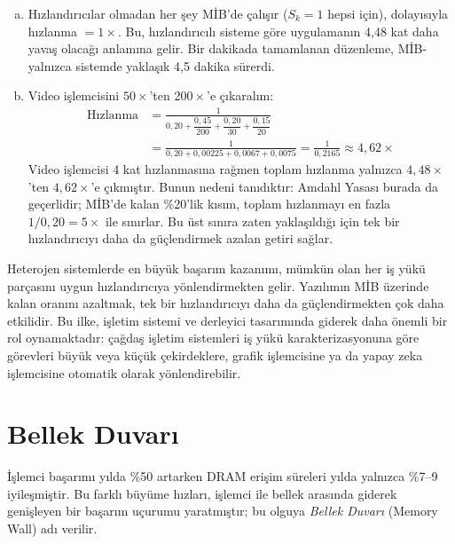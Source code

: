 \begin{ornek}[2.12]
\begin{enumerate}[(a)]
    \item Hızlandırıcılar olmadan her şey MİB'de çalışır ($S_k = 1$ hepsi için), dolayısıyla hızlanma $= 1\times$. Bu, hızlandırıcılı sisteme göre uygulamanın 4,48 kat daha yavaş olacağı anlamına gelir. Bir dakikada tamamlanan düzenleme, MİB-yalnızca sistemde yaklaşık 4,5 dakika sürerdi.

    \item Video işlemcisini $50\times$'ten $200\times$'e çıkaralım:
    \begin{align*}
    \text{Hızlanma} &= \frac{1}{0{,}20 + \dfrac{0{,}45}{200} + \dfrac{0{,}20}{30} + \dfrac{0{,}15}{20}} \\[6pt]
    &= \frac{1}{0{,}20 + 0{,}00225 + 0{,}0067 + 0{,}0075}
    = \frac{1}{0{,}2165}
    \approx 4{,}62\times
    \end{align*}
    Video işlemcisi 4 kat hızlanmasına rağmen toplam hızlanma yalnızca $4{,}48\times$'ten $4{,}62\times$'e çıkmıştır. Bunun nedeni tanıdıktır: Amdahl Yasası burada da geçerlidir; MİB'de kalan \%20'lik kısım, toplam hızlanmayı en fazla $1/0{,}20 = 5\times$ ile sınırlar. Bu üst sınıra zaten yaklaşıldığı için tek bir hızlandırıcıyı daha da güçlendirmek azalan getiri sağlar.
\end{enumerate}
\end{ornek}

\begin{bilginot}
Heterojen sistemlerde en büyük başarım kazanımı, mümkün olan her iş yükü parçasını uygun hızlandırıcıya yönlendirmekten gelir. Yazılımın MİB üzerinde kalan oranını azaltmak, tek bir hızlandırıcıyı daha da güçlendirmekten çok daha etkilidir. Bu ilke, işletim sistemi ve derleyici tasarımında giderek daha önemli bir rol oynamaktadır: çağdaş işletim sistemleri iş yükü karakterizasyonuna göre görevleri büyük veya küçük çekirdeklere, grafik işlemcisine ya da yapay zeka işlemcisine otomatik olarak yönlendirebilir.
\end{bilginot}


\section{Bellek Duvarı}
\label{sec:bellek-duvari}

İşlemci başarımı yılda \%50 artarken DRAM erişim süreleri yılda yalnızca \%7--9 iyileşmiştir. Bu farklı büyüme hızları, işlemci ile bellek arasında giderek genişleyen bir başarım uçurumu yaratmıştır; bu olguya \emph{Bellek Duvarı} (Memory Wall) adı verilir.

